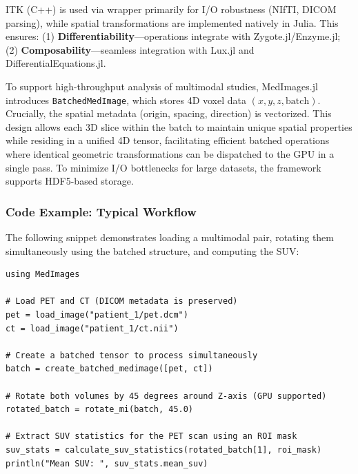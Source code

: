 \documentclass[10pt,letterpaper]{article}
\begin{document}
ITK (C++) is used via wrapper primarily for I/O robustness (NIfTI, DICOM parsing), while spatial transformations are implemented natively in Julia. This ensures: (1) \textbf{Differentiability}—operations integrate with Zygote.jl/Enzyme.jl; (2) \textbf{Composability}—seamless integration with Lux.jl and DifferentialEquations.jl.

To support high-throughput analysis of multimodal studies, MedImages.jl introduces \texttt{BatchedMedImage}, which stores 4D voxel data $(x, y, z, \text{batch})$. Crucially, the spatial metadata (origin, spacing, direction) is vectorized. This design allows each 3D slice within the batch to maintain unique spatial properties while residing in a unified 4D tensor, facilitating efficient batched operations where identical geometric transformations can be dispatched to the GPU in a single pass. To minimize I/O bottlenecks for large datasets, the framework supports HDF5-based storage.

\subsubsection*{Code Example: Typical Workflow}
The following snippet demonstrates loading a multimodal pair, rotating them simultaneously using the batched structure, and computing the SUV:

\begin{lstlisting}[basicstyle=\ttfamily\footnotesize]
using MedImages

# Load PET and CT (DICOM metadata is preserved)
pet = load_image("patient_1/pet.dcm")
ct = load_image("patient_1/ct.nii")

# Create a batched tensor to process simultaneously
batch = create_batched_medimage([pet, ct])

# Rotate both volumes by 45 degrees around Z-axis (GPU supported)
rotated_batch = rotate_mi(batch, 45.0)

# Extract SUV statistics for the PET scan using an ROI mask
suv_stats = calculate_suv_statistics(rotated_batch[1], roi_mask)
println("Mean SUV: ", suv_stats.mean_suv)
\end{lstlisting}
\end{document}
